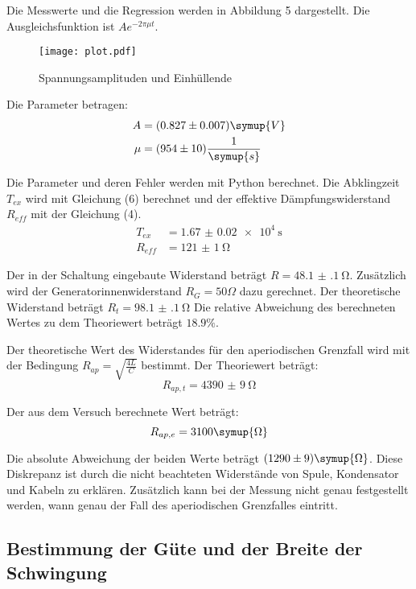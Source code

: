 Die Messwerte und die Regression werden in Abbildung 5 dargestellt. Die Ausgleichsfunktion ist $Ae^{-2\pi \mu t}$.

\begin{figure}[H]
  \centering
  \texttt{[image: plot.pdf]}
  \caption{Spannungsamplituden und Einhüllende}
  \label{fig:plot}
\end{figure}

Die Parameter betragen:
\begin{align*}
  A &= (0.827 \pm 0.007) \symup{V} \\
  \mu &= (954 \pm 10)\frac{1}{\symup{s}}
\end{align*}

Die Parameter und deren Fehler werden mit Python berechnet.
Die Abklingzeit $T_{ex}$ wird mit Gleichung (6) berechnet und der effektive Dämpfungswiderstand $R_{eff}$ mit
der Gleichung (4).
\begin{align*}
T_{ex} &= \SI{1.67(2)e4}{\second} \\
R_{eff} &= \SI{121(1)}{\ohm}
\end{align*}

Der in der Schaltung eingebaute Widerstand beträgt $R = \SI{48.1(1)}{\ohm}$. Zusätzlich wird der
Generatorinnenwiderstand $R_G = 50 \Omega$ dazu gerechnet. Der theoretische Widerstand beträgt $R_t = \SI{98.1(1)}{\ohm}$
Die relative Abweichung des berechneten Wertes zu dem Theoriewert beträgt $18.9\%$.


Der theoretische Wert des Widerstandes für den aperiodischen Grenzfall wird mit der Bedingung
$R_{ap} =\sqrt{\frac{4L}{C}}$ bestimmt. Der Theoriewert beträgt:
\begin{equation*}
  R_{ap,t} = \SI{4390(9)}{\ohm}
\end{equation*}

Der aus dem Versuch berechnete Wert beträgt:
\begin{equation*}
  R_{ap,e} = 3100 \symup{\Omega}
\end{equation*}

Die absolute Abweichung der beiden Werte beträgt $(1290 \pm 9) \symup{\Omega}$.
Diese Diskrepanz ist durch die nicht beachteten Widerstände von Spule, Kondensator und Kabeln zu erklären. Zusätzlich
kann bei der Messung nicht genau festgestellt werden, wann genau der Fall des aperiodischen Grenzfalles eintritt.


\subsection{Bestimmung der Güte und der Breite der Schwingung}

